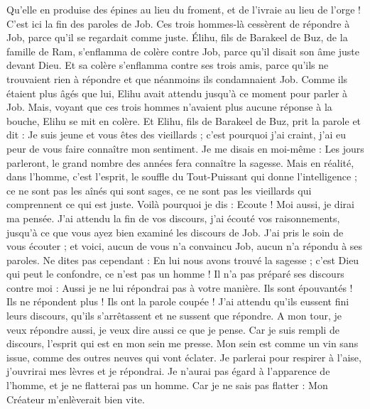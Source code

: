 \begin{multicols}{2}
Qu'elle en produise des épines au lieu du froment, et de l'ivraie au lieu de l'orge ! C'est ici la fin des paroles de Job.
\VerseOne{}Ces trois hommes-là cessèrent de répondre à Job, parce qu'il se regardait comme juste.
Élihu, fils de Barakeel de Buz, de la famille de Ram, s'enflamma de colère contre Job, parce qu'il disait son âme juste devant Dieu.
Et sa colère s'enflamma contre ses trois amis, parce qu'ils ne trouvaient rien à répondre et que néanmoins ils condamnaient Job.
Comme ils étaient plus âgés que lui, Elihu avait attendu jusqu'à ce moment pour parler à Job.
Mais, voyant que ces trois hommes n'avaient plus aucune réponse à la bouche, Elihu se mit en colère.
Et Elihu, fils de Barakeel de Buz, prit la parole et dit : Je suis jeune et vous êtes des vieillards ; c'est pourquoi j'ai craint, j'ai eu peur de vous faire connaître mon sentiment.
Je me disais en moi-même : Les jours parleront, le grand nombre des années fera connaître la sagesse.
Mais en réalité, dans l'homme, c'est l'esprit, le souffle du Tout-Puissant qui donne l'intelligence ;
ce ne sont pas les aînés qui sont sages, ce ne sont pas les vieillards qui comprennent ce qui est juste.
Voilà pourquoi je dis : Ecoute ! Moi aussi, je dirai ma pensée.
J'ai attendu la fin de vos discours, j'ai écouté vos raisonnements, jusqu'à ce que vous ayez bien examiné les discours de Job.
J'ai pris le soin de vous écouter ; et voici, aucun de vous n'a convaincu Job, aucun n'a répondu à ses paroles.
Ne dites pas cependant : En lui nous avons trouvé la sagesse ; c'est Dieu qui peut le confondre, ce n'est pas un homme !
Il n'a pas préparé ses discours contre moi : Aussi je ne lui répondrai pas à votre manière.
Ils sont épouvantés ! Ils ne répondent plus ! Ils ont la parole coupée !
J'ai attendu qu'ils eussent fini leurs discours, qu'ils s'arrêtassent et ne sussent que répondre.
A mon tour, je veux répondre aussi, je veux dire aussi ce que je pense.
Car je suis rempli de discours, l'esprit qui est en mon sein me presse.
Mon sein est comme un vin sans issue, comme des outres neuves qui vont éclater.
Je parlerai pour respirer à l'aise, j'ouvrirai mes lèvres et je répondrai.
Je n'aurai pas égard à l'apparence de l'homme, et je ne flatterai pas un homme.
Car je ne sais pas flatter : Mon Créateur m'enlèverait bien vite.

\end{multicols}
